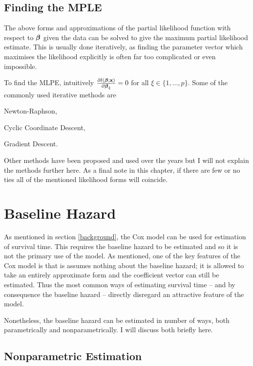 \subsection{Finding the MPLE}

The above forms and approximations of the partial likelihood function with respect to $\boldsymbol{\beta}$ given the data can be solved to give the maximum partial likelihood estimate. This is usually done iteratively, as finding the parameter vector which maximises the likelihood explicitly is often far too complicated or even impossible. 

To find the MLPE, intuitively $\pdv{l(\boldsymbol{\beta};\textbf{x})}{\boldsymbol{\beta}_\xi}=0$ for all $\xi\in\{1,\ldots,p\}$. Some of the commonly used iterative methods are

\begin{itemize}
\begin{spacing}{0}
    \item Newton-Raphson,
    \item Cyclic Coordinate Descent,
    \item Gradient Descent.
\end{spacing}
\end{itemize}

Other methods have been proposed and used over the years but I will not explain the methods further here. 
As a final note in this chapter, if there are few or no ties all of the mentioned likelihood forms will coincide.

\section{Baseline Hazard}\label{baseline}

As mentioned in section \ref{background}, the Cox model can be used for estimation of survival time. This requires the baseline hazard to be estimated and so it is not the primary use of the model. As mentioned, one of the key features of the Cox model is that is assumes nothing about the baseline hazard; it is allowed to take an entirely approximate form and the coefficient vector can still be estimated. Thus the most common ways of estimating survival time -- and by consequence the baseline hazard -- directly disregard an attractive feature of the model.

Nonetheless, the baseline hazard can be estimated in number of ways, both parametrically and nonparametrically. I will discuss both briefly here. 

\subsection{Nonparametric Estimation}

